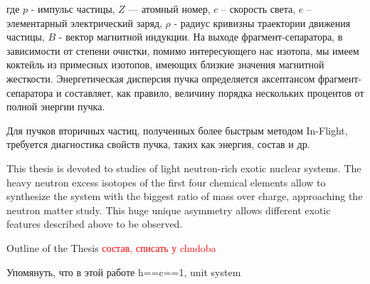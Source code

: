 где $p$ - импульс частицы, $Z$ — атомный номер, $c$ – скорость света, $e$ – элементарный электрический заряд, $\rho$ - радиус кривизны траектории движения частицы, $B$ - вектор магнитной индукции.  На выходе фрагмент-сепаратора, в зависимости от степени очистки, помимо интересующего нас изотопа, мы имеем коктейль из примесных изотопов, имеющих близкие значения магнитной жесткости. Энергетическая дисперсия пучка определяется аксептансом фрагмент-сепаратора и составляет, как правило, величину порядка нескольких процентов от полной энергии пучка. 


%
%
%
Для пучков вторичных частиц, полученных более быстрым методом In-Flight, требуется диагностика свойств пучка, таких как энергия, состав и др.



This thesis is devoted to studies of light neutron-rich exotic nuclear systems.
The heavy neutron excess isotopes of the first four chemical elements allow to synthesize the system with the biggest ratio of mass over charge, approaching the neutron matter study.
This huge unique asymmetry allows different exotic features described above to be observed.

Outline of the Thesis
\textcolor{red}{состав, списать у chudoba}

Упомянуть, что в этой работе h==c==1, unit system











